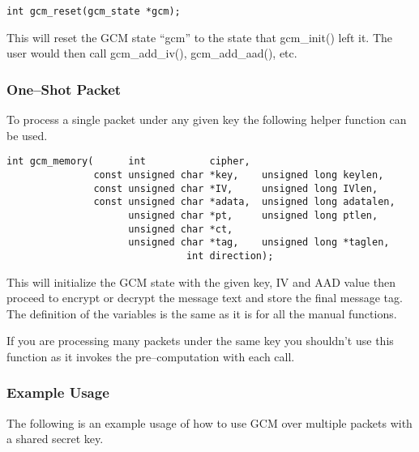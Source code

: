 \documentclass[a4paper]{book}
\begin{document}
\begin{verbatim}
int gcm_reset(gcm_state *gcm);
\end{verbatim}

This will reset the GCM state ``gcm'' to the state that gcm\_init() left it.  The user would then call gcm\_add\_iv(), gcm\_add\_aad(), etc.

\subsubsection{One--Shot Packet}
To process a single packet under any given key the following helper function can be used.

\begin{verbatim}
int gcm_memory(      int           cipher,
               const unsigned char *key,    unsigned long keylen,
               const unsigned char *IV,     unsigned long IVlen,
               const unsigned char *adata,  unsigned long adatalen,
                     unsigned char *pt,     unsigned long ptlen,
                     unsigned char *ct, 
                     unsigned char *tag,    unsigned long *taglen,
                               int direction);
\end{verbatim}

This will initialize the GCM state with the given key, IV and AAD value then proceed to encrypt or decrypt the message text and store the final
message tag.  The definition of the variables is the same as it is for all the manual functions.

If you are processing many packets under the same key you shouldn't use this function as it invokes the pre--computation with each call.

\subsubsection{Example Usage}
The following is an example usage of how to use GCM over multiple packets with a shared secret key.
\end{document}
